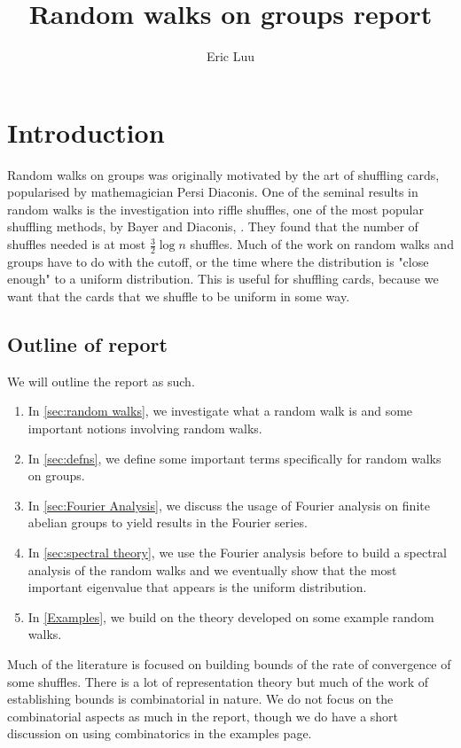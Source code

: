 \documentclass[]{article}
\title{Random walks on groups report}
\author{Eric Luu}
\theoremstyle{definition}
\numberwithin{theorem}{section}
\numberwithin{equation}{section}
\begin{document}
\maketitle
\section{Introduction}
Random walks on groups was originally motivated by the art of shuffling cards, popularised by mathemagician Persi Diaconis. One of the seminal results in random walks is the investigation into riffle shuffles, one of the most popular shuffling methods, by Bayer and Diaconis, \cite{bayerTrailingDovetailShuffle1992}. They found that the number of shuffles needed is at most $\frac{3}{2} \log n$ shuffles. Much of the work on random walks and groups have to do with the cutoff, or the time where the distribution is "close enough" to a uniform distribution. This is useful for shuffling cards, because we want that the cards that we shuffle to be uniform in some way.
\subsection{Outline of report}
We will outline the report as such.
\begin{enumerate}
	\item In \cref{sec:random walks}, we investigate what a random walk is and some important notions involving random walks. 
	\item In \cref{sec:defns}, we define some important terms specifically for random walks on groups. 
	\item In \cref{sec:Fourier Analysis}, we discuss the usage of Fourier analysis on finite abelian groups to yield results in the Fourier series.
	\item In \cref{sec:spectral theory}, we use the Fourier analysis before to build a spectral analysis of the random walks and we eventually show that the most important eigenvalue that appears is the uniform distribution. 
	\item In \cref{Examples}, we build on the theory developed on some example random walks. 
\end{enumerate}
Much of the literature is focused on building bounds of the rate of convergence of some shuffles. There is a lot of representation theory but much of the work of establishing bounds is combinatorial in nature. We do not focus on the combinatorial aspects as much in the report, though we do have a short discussion on using combinatorics in the examples page. 
\end{document}
